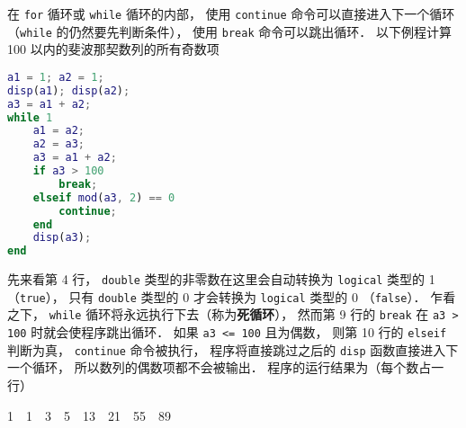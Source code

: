 在 \texttt{for} 循环或 \texttt{while} 循环的内部， 使用 \texttt{continue} 命令可以直接进入下一个循环（\texttt{while} 的仍然要先判断条件）， 使用 \texttt{break} 命令可以跳出循环． 以下例程计算 100 以内的斐波那契数列的所有奇数项
\begin{lstlisting}[language=Matlab]
a1 = 1; a2 = 1;
disp(a1); disp(a2);
a3 = a1 + a2;
while 1
    a1 = a2;
    a2 = a3;
    a3 = a1 + a2;
    if a3 > 100
        break;
    elseif mod(a3, 2) == 0
        continue;
    end
    disp(a3);
end
\end{lstlisting}
先来看第 4 行， \texttt{double} 类型的非零数在这里会自动转换为 \texttt{logical} 类型的 1 （\texttt{true}）， 只有 \texttt{double} 类型的 0 才会转换为 \texttt{logical} 类型的 0 （\texttt{false}）． 乍看之下， \texttt{while} 循环将永远执行下去（称为\textbf{死循环}）， 然而第 9 行的 \texttt{break} 在 \texttt{a3 > 100} 时就会使程序跳出循环． 如果 \texttt{a3 <= 100} 且为偶数， 则第 10 行的 \texttt{elseif} 判断为真， \texttt{continue} 命令被执行， 程序将直接跳过之后的 \texttt{disp} 函数直接进入下一个循环， 所以数列的偶数项都不会被输出． 程序的运行结果为（每个数占一行）
\begin{Command}
1\ \ 1\ \ 3\ \ 5\ \ 13\ \ 21\ \ 55\ \ 89
\end{Command}